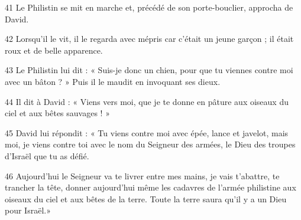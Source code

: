 
41 Le Philistin se mit en marche et, précédé de son porte-bouclier, approcha de David.

42 Lorsqu’il le vit, il le regarda avec mépris car c’était un jeune garçon ; il était roux et de belle apparence.

43 Le Philistin lui dit : « Suis-je donc un chien, pour que tu viennes contre moi avec un bâton ? » Puis il le maudit en invoquant ses dieux.

44 Il dit à David : « Viens vers moi, que je te donne en pâture aux oiseaux du ciel et aux bêtes sauvages ! »

45 David lui répondit : « Tu viens contre moi avec épée, lance et javelot, mais moi, je viens contre toi avec le nom du Seigneur des armées, le Dieu des troupes d’Israël que tu as défié.

46 Aujourd’hui le Seigneur va te livrer entre mes mains, je vais t’abattre, te trancher la tête, donner aujourd’hui même les cadavres de l’armée philistine aux oiseaux du ciel et aux bêtes de la terre. Toute la terre saura qu’il y a un Dieu pour Israël.»
